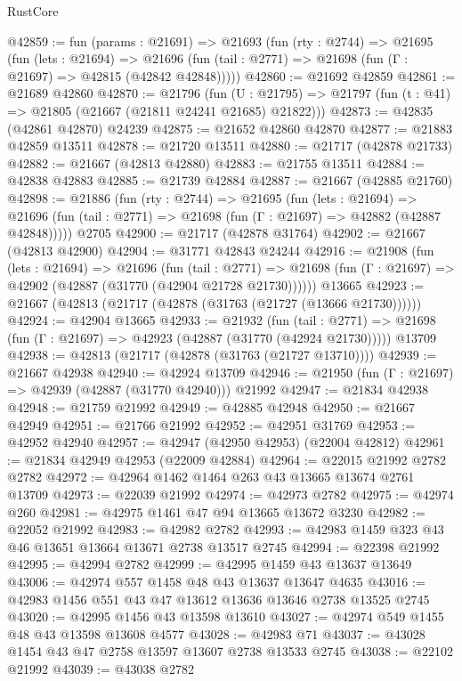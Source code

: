\begin{lexlean}{RustCore}
\begin{coremodule}
@42859 := fun (params : @21691) =>
  @21693
    (fun (rty : @2744) =>
    @21695
      (fun (lets : @21694) =>
      @21696 (fun (tail : @2771) => @21698 (fun (Γ : @21697) => @42815 (@42842 @42848)))))
@42860 := @21692 @42859
@42861 := @21689 @42860
@42870 := @21796
    (fun (U : @21795) => @21797 (fun (t : @41) => @21805 (@21667 (@21811 @24241 @21685) @21822)))
@42873 := @42835 (@42861 @42870) @24239
@42875 := @21652 @42860 @42870
@42877 := @21883 @42859 @13511
@42878 := @21720 @13511
@42880 := @21717 (@42878 @21733)
@42882 := @21667 (@42813 @42880)
@42883 := @21755 @13511
@42884 := @42838 @42883
@42885 := @21739 @42884
@42887 := @21667 (@42885 @21760)
@42898 := @21886
    (fun (rty : @2744) =>
    @21695
      (fun (lets : @21694) =>
      @21696 (fun (tail : @2771) => @21698 (fun (Γ : @21697) => @42882 (@42887 @42848)))))
    @2705
@42900 := @21717 (@42878 @31764)
@42902 := @21667 (@42813 @42900)
@42904 := @31771 @42843 @24244
@42916 := @21908
    (fun (lets : @21694) =>
    @21696
      (fun (tail : @2771) =>
      @21698 (fun (Γ : @21697) => @42902 (@42887 (@31770 (@42904 @21728 @21730))))))
    @13665
@42923 := @21667 (@42813 (@21717 (@42878 (@31763 (@21727 (@13666 @21730))))))
@42924 := @42904 @13665
@42933 := @21932
    (fun (tail : @2771) => @21698 (fun (Γ : @21697) => @42923 (@42887 (@31770 (@42924 @21730)))))
    @13709
@42938 := @42813 (@21717 (@42878 (@31763 (@21727 @13710))))
@42939 := @21667 @42938
@42940 := @42924 @13709
@42946 := @21950 (fun (Γ : @21697) => @42939 (@42887 (@31770 @42940))) @21992
@42947 := @21834 @42938
@42948 := @21759 @21992
@42949 := @42885 @42948
@42950 := @21667 @42949
@42951 := @21766 @21992
@42952 := @42951 @31769
@42953 := @42952 @42940
@42957 := @42947 (@42950 @42953) (@22004 @42812)
@42961 := @21834 @42949 @42953 (@22009 @42884)
@42964 := @22015 @21992 @2782 @2782
@42972 := @42964 @1462 @1464 @263 @43 @13665 @13674 @2761 @13709
@42973 := @22039 @21992
@42974 := @42973 @2782
@42975 := @42974 @260
@42981 := @42975 @1461 @47 @94 @13665 @13672 @3230
@42982 := @22052 @21992
@42983 := @42982 @2782
@42993 := @42983 @1459 @323 @43 @46 @13651 @13664 @13671 @2738 @13517 @2745
@42994 := @22398 @21992
@42995 := @42994 @2782
@42999 := @42995 @1459 @43 @13637 @13649
@43006 := @42974 @557 @1458 @48 @43 @13637 @13647 @4635
@43016 := @42983 @1456 @551 @43 @47 @13612 @13636 @13646 @2738 @13525 @2745
@43020 := @42995 @1456 @43 @13598 @13610
@43027 := @42974 @549 @1455 @48 @43 @13598 @13608 @4577
@43028 := @42983 @71
@43037 := @43028 @1454 @43 @47 @2758 @13597 @13607 @2738 @13533 @2745
@43038 := @22102 @21992
@43039 := @43038 @2782

\end{coremodule}
\end{lexlean}
